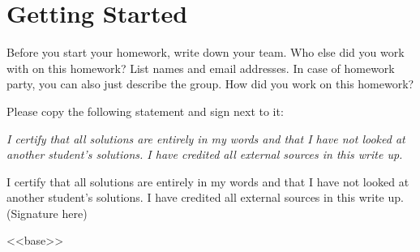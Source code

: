 \documentclass[11pt]{article}
\begin{document}
\maketitle
\fontsize{12}{15}\selectfont

\section{Getting Started}
Before you start your homework, write down your team. Who else did you work with on this homework? List names and email addresses. In case of homework party, you can also just describe the group. How did you work on this homework?

Please copy the following statement and sign next to it:

\textit{I certify that all solutions are entirely in my words and that I have not looked at another student's solutions. I have credited all external sources in this write up.}

\vspace{15pt}
{\color{blue} I certify that all solutions are entirely in my words and that I have not looked at another student's solutions. I have credited all external sources in this write up. (Signature here)}

<<base>>
\end{document}
